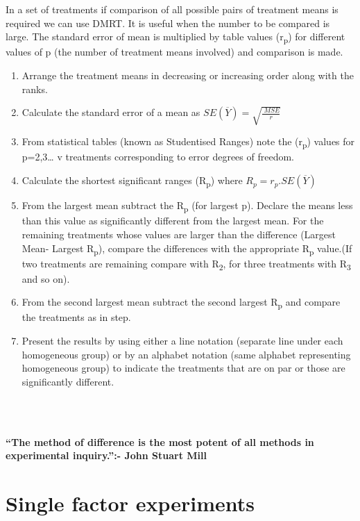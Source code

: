 \documentclass[
]{book}
\begin{document}
In a set of treatments if comparison of all possible pairs of treatment means is required we can use DMRT. It is useful when the number to be compared is large. The standard error of mean is multiplied by table values (r\textsubscript{p}) for different values of p (the number of treatment means involved) and comparison is made.

\begin{enumerate}
\def\labelenumi{(\roman{enumi})}
\item
  Arrange the treatment means in decreasing or increasing order along with the ranks.
\item
  Calculate the standard error of a mean as \(SE(\overline{Y})=\sqrt{\frac{\ MSE}{r}}\)
\item
  From statistical tables (known as Studentised Ranges) note the (r\textsubscript{p}) values for p=2,3\ldots{} v treatments corresponding to error degrees of freedom.
\item
  Calculate the shortest significant ranges (R\textsubscript{p}) where \(R_p=r_p.SE(\overline{Y})\)
\item
  From the largest mean subtract the R\textsubscript{p} (for largest p). Declare the means less than this value as significantly different from the largest mean. For the remaining treatments whose values are larger than the difference (Largest Mean- Largest R\textsubscript{p}), compare the differences with the appropriate R\textsubscript{p} value.(If two treatments are remaining compare with R\textsubscript{2}, for three treatments with R\textsubscript{3} and so on).
\item
  From the second largest mean subtract the second largest R\textsubscript{p} and compare the treatments as in step.
\item
  Present the results by using either a line notation (separate line under each homogeneous group) or by an alphabet notation (same alphabet representing homogeneous group) to indicate the treatments that are on par or those are significantly different.
\end{enumerate}

~\\
\hspace*{0.333em}\\
\hspace*{0.333em}

\hypertarget{hello}{}
\textbf{``The method of difference is the most potent of all methods in experimental inquiry.'':- John Stuart Mill}

\hypertarget{single-factor-experiments}{%
\chapter{Single factor experiments}\label{single-factor-experiments}}
\end{document}
